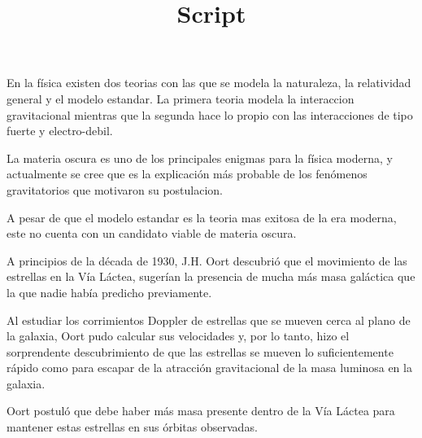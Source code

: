 \documentclass[12pt,letterpaper]{article}
\title{Script}
\newcounter{example}[enumi]
\begin{document}
	
	\begin{tcolorbox}[title= Slide \arabic{example} ]
		En la física existen dos teorias con las que se modela la naturaleza, la relatividad general y el modelo estandar. La primera teoria modela la interaccion gravitacional mientras que la segunda hace lo propio con las interacciones de tipo fuerte y electro-debil. 

		La materia oscura es uno de los principales enigmas para la física moderna, y actualmente se cree que es la explicación más probable de los fenómenos gravitatorios que motivaron su postulacion.
		
		A pesar de que el modelo estandar es la teoria mas exitosa de la era moderna, este no cuenta con un candidato viable de materia oscura.
	
	\end{tcolorbox}
	
	\begin{tcolorbox}[title= Slide \arabic{example} ]
	
	A principios de la década de 1930, J.H. Oort descubrió que el movimiento de las estrellas en la Vía Láctea, sugerían la presencia de mucha más masa galáctica que la que nadie había predicho previamente.
	
 	Al estudiar los corrimientos Doppler de estrellas que se mueven cerca al plano de la galaxia, Oort pudo calcular sus velocidades y, por lo tanto, hizo el sorprendente descubrimiento de que las estrellas se mueven lo suficientemente rápido como para escapar de la atracción gravitacional de la masa luminosa en la galaxia.
 	
 	Oort postuló que debe haber más masa presente dentro de la Vía Láctea para mantener estas estrellas en sus órbitas observadas. %
	\end{tcolorbox}
\end{document}
